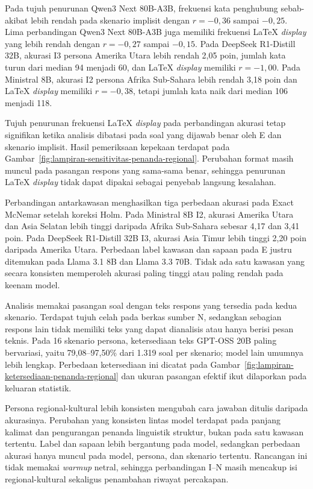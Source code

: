 Pada tujuh penurunan Qwen3 Next 80B-A3B, frekuensi kata penghubung sebab-akibat
lebih rendah pada skenario implisit dengan $r=-0{,}36$ sampai $-0{,}25$. Lima
perbandingan Qwen3 Next 80B-A3B juga memiliki frekuensi LaTeX \textit{display}
yang lebih rendah dengan $r=-0{,}27$ sampai $-0{,}15$. Pada DeepSeek
R1-Distill 32B, akurasi I3 persona Amerika Utara lebih rendah 2,05 poin,
jumlah kata turun dari median 94 menjadi 60, dan LaTeX \textit{display}
memiliki $r=-1{,}00$. Pada Ministral 8B, akurasi I2 persona Afrika Sub-Sahara
lebih rendah 3,18 poin dan LaTeX \textit{display} memiliki $r=-0{,}38$, tetapi
jumlah kata naik dari median 106 menjadi 118.

Tujuh penurunan frekuensi LaTeX \textit{display} pada perbandingan akurasi
tetap signifikan ketika analisis dibatasi pada soal yang dijawab benar oleh E
dan skenario implisit. Hasil pemeriksaan kepekaan terdapat pada
Gambar~\ref{fig:lampiran-sensitivitas-penanda-regional}. Perubahan format masih
muncul pada pasangan respons yang sama-sama benar, sehingga penurunan LaTeX
\textit{display} tidak dapat dipakai sebagai penyebab langsung kesalahan.

Perbandingan antarkawasan menghasilkan tiga perbedaan akurasi pada
Exact McNemar setelah koreksi Holm. Pada Ministral 8B I2, akurasi Amerika Utara
dan Asia Selatan lebih tinggi daripada Afrika Sub-Sahara sebesar 4,17 dan 3,41
poin. Pada DeepSeek R1-Distill 32B I3, akurasi Asia Timur lebih tinggi 2,20 poin
daripada Amerika Utara. Perbedaan label kawasan dan sapaan pada E justru
ditemukan pada Llama 3.1 8B dan Llama 3.3 70B. Tidak ada satu kawasan yang
secara konsisten memperoleh akurasi paling tinggi atau paling rendah pada
keenam model.

Analisis memakai pasangan soal dengan teks respons yang tersedia pada kedua
skenario. Terdapat tujuh celah pada berkas sumber N, sedangkan sebagian respons
lain tidak memiliki teks yang dapat dianalisis atau hanya berisi pesan teknis.
Pada 16 skenario persona, ketersediaan teks GPT-OSS 20B paling bervariasi,
yaitu 79,08--97,50\% dari 1.319 soal per skenario; model lain umumnya lebih
lengkap.
Perbedaan ketersediaan ini dicatat pada
Gambar~\ref{fig:lampiran-ketersediaan-penanda-regional} dan ukuran pasangan
efektif ikut dilaporkan pada keluaran statistik.

Persona regional-kultural lebih konsisten mengubah cara jawaban ditulis
daripada akurasinya. Perubahan yang konsisten lintas model
terdapat pada panjang kalimat dan pengurangan penanda linguistik struktur, bukan pada satu
kawasan tertentu. Label dan sapaan lebih bergantung pada model, sedangkan
perbedaan akurasi hanya muncul pada model, persona, dan skenario tertentu.
Rancangan ini tidak memakai \textit{warmup} netral, sehingga perbandingan I--N
masih mencakup isi regional-kultural sekaligus penambahan riwayat percakapan.

